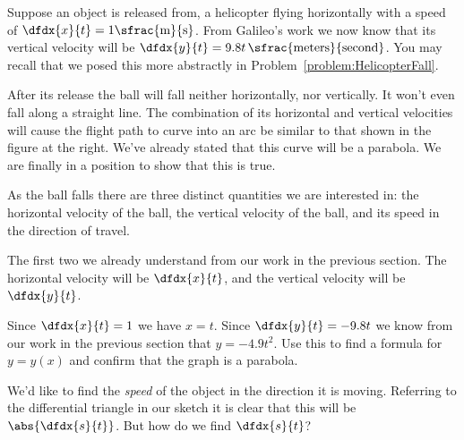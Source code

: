 
 Suppose an  object is 
released  from,  a helicopter  flying horizontally with a
speed of $\dfdx{x}{t}=1\sfrac{\text{m}}{\text{s}}$.  From Galileo's
work we now know that its vertical velocity will be
$\dfdx{y}{t}=9.8 t\, \sfrac{\text{meters}}{\text{second}}$. You may
recall that we posed this more abstractly in
Problem~\ref{problem:HelicopterFall}.

After its release the ball will fall neither horizontally, nor
vertically. It won't even fall along a straight line. The combination
of its horizontal and vertical velocities will cause the flight path
to curve into an arc be similar to that shown in the
figure at the right. We've already stated that this curve will be a
parabola. We are finally in a position to show that this is true.

As the ball falls there are three distinct quantities we are
interested in: the horizontal velocity of the ball, the vertical
velocity of the ball, and its speed in the direction of travel.

The first two we already understand from our work in the previous
section. The horizontal velocity will be $\dfdx{x}{t}$, and the
vertical velocity will be $\dfdx{y}{t}$.

\begin{ProficiencyDrill}
  Since $\dfdx{x}{t}=1$ we have $x=t$. Since  $\dfdx{y}{t}=-9.8t$ we know from our work
  in the previous section that $y=-4.9t^2.$ Use this to find a formula
  for $y=y(x)$ and confirm that the graph is a parabola.
\end{ProficiencyDrill}
We'd like to find the \emph{speed} of the object in the direction it
is moving.  Referring to the differential triangle in our sketch it is
clear that this will be $\abs{\dfdx{s}{t}}$.  But how do we
find $\dfdx{s}{t}$?

